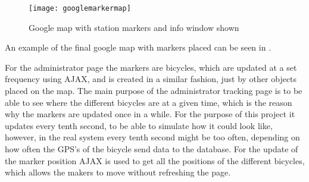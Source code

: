 \begin{figure}[h]
	\centering
	\texttt{[image: googlemarkermap]}
	\caption{Google map with station markers and info window shown}
	\label{fig:googlemapmarkerinfowindow}
\end{figure}

An example of the final google map with markers placed can be seen in .

For the administrator page the markers are bicycles, which are updated at a set frequency using AJAX, and is created in a similar fashion, just by other objects placed on the map.
The main purpose of the administrator tracking page is to be able to see where the different bicycles are at a given time, which is the reason why the markers are updated once in a while.
For the purpose of this project it updates every tenth second, to be able to simulate how it could look like, however, in the real system every tenth second might be too often, depending on how often the GPS's of the bicycle send data to the database.
For the update of the marker position AJAX is used to get all the positions of the different bicycles, which allows the makers to move without refreshing the page.